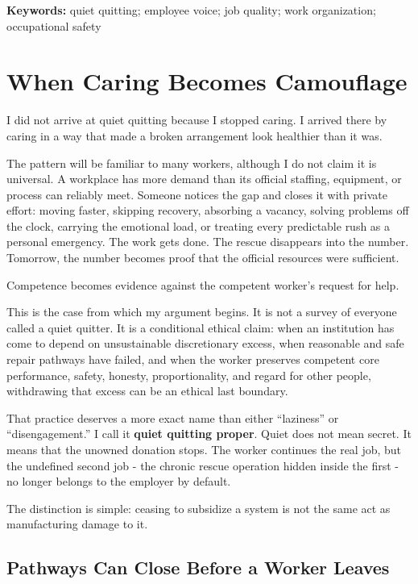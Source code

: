 \documentclass[12pt,oneside]{article}
\begin{document}
\textbf{Keywords:} quiet quitting; employee voice; job quality; work
organization; occupational safety

\hypertarget{when-caring-becomes-camouflage}{%
\section{When Caring Becomes
Camouflage}\label{when-caring-becomes-camouflage}}

I did not arrive at quiet quitting because I stopped caring. I arrived
there by caring in a way that made a broken arrangement look healthier
than it was.

The pattern will be familiar to many workers, although I do not claim it
is universal. A workplace has more demand than its official staffing,
equipment, or process can reliably meet. Someone notices the gap and
closes it with private effort: moving faster, skipping recovery,
absorbing a vacancy, solving problems off the clock, carrying the
emotional load, or treating every predictable rush as a personal
emergency. The work gets done. The rescue disappears into the number.
Tomorrow, the number becomes proof that the official resources were
sufficient.

Competence becomes evidence against the competent worker's request for
help.

This is the case from which my argument begins. It is not a survey of
everyone called a quiet quitter. It is a conditional ethical claim: when
an institution has come to depend on unsustainable discretionary excess,
when reasonable and safe repair pathways have failed, and when the
worker preserves competent core performance, safety, honesty,
proportionality, and regard for other people, withdrawing that excess
can be an ethical last boundary.

That practice deserves a more exact name than either ``laziness'' or
``disengagement.'' I call it \textbf{quiet quitting proper}. Quiet does
not mean secret. It means that the unowned donation stops. The worker
continues the real job, but the undefined second job - the chronic
rescue operation hidden inside the first - no longer belongs to the
employer by default.

The distinction is simple: ceasing to subsidize a system is not the same
act as manufacturing damage to it.

\hypertarget{pathways-can-close-before-a-worker-leaves}{%
\subsection{Pathways Can Close Before a Worker
Leaves}\label{pathways-can-close-before-a-worker-leaves}}
\end{document}
